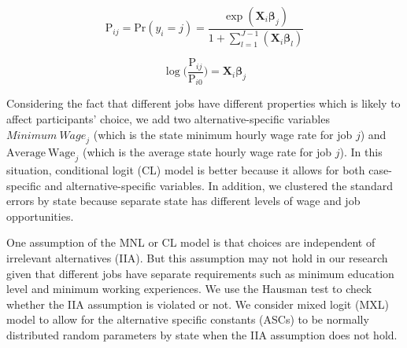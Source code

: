 \begin{equation}
  \label{eq:2}
  \mathrm{P}_{ij}
  = \mathrm{Pr}(y_i = j)
  = \frac{
    \exp (\pmb{X}_i \pmb{\beta}_j)
  }{
    1 + \sum_{l=1}^{J-1}(\pmb{X}_i \pmb{\beta}_l)
  }
\end{equation}

\begin{equation}
  \label{eq:3}
  \log \biggl(
  \frac{\mathrm{P}_{ij}
  }{
    \mathrm{P}_{i0}
  }  \biggr)
  = \pmb{X}_i \pmb{\beta}_j
\end{equation}

Considering the fact that different jobs have different properties which is likely to affect participants' choice, we add two alternative-specific variables $\mathit{Minimum\ Wage}_j$ (which is the state minimum hourly wage rate for job $j$) and $\mathrm{Average\ Wage}_j$ (which is the average state hourly wage rate for job $j$).
In this situation, conditional logit (CL) model is better because it allows for both case-specific and alternative-specific variables.
In addition, we clustered the standard errors by state because separate state has different levels of wage and job opportunities.

One assumption of the MNL or CL model is that choices are independent of irrelevant alternatives (IIA).
But this assumption may not hold in our research given that different jobs have separate requirements such as minimum education level and minimum working experiences.
We use the Hausman test to check whether the IIA assumption is violated or not.
We consider mixed logit (MXL) model to allow for the alternative specific constants (ASCs) to be normally distributed random parameters by state when the IIA assumption does not hold.

